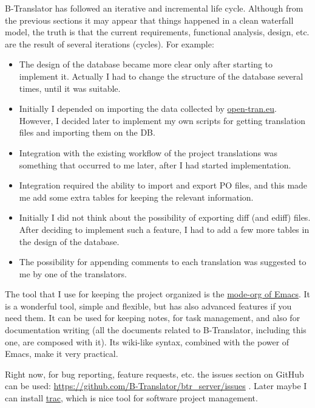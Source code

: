 \documentclass[11pt]{article}
\begin{document}
  B-Translator has followed an iterative and incremental life cycle.
  Although from the previous sections it may appear that things
  happened in a clean waterfall model, the truth is that the current
  requirements, functional analysis, design, etc. are the result of
  several iterations (cycles). For example:
\begin{itemize}
\item The design of the database became more clear only after starting
    to implement it. Actually I had to change the structure of the
    database several times, until it was suitable.
\item Initially I depended on importing the data collected by
    \href{http://open-tran.eu/}{open-tran.eu}. However, I decided later to implement my own scripts
    for getting translation files and importing them on the DB.
\item Integration with the existing workflow of the project translations
    was something that occurred to me later, after I had started
    implementation.
\item Integration required the ability to import and export PO files,
    and this made me add some extra tables for keeping the relevant
    information.
\item Initially I did not think about the possibility of exporting diff
    (and ediff) files.  After deciding to implement such a feature, I
    had to add a few more tables in the design of the database.
\item The possibility for appending comments to each translation was
    suggested to me by one of the translators.
\end{itemize}
  The tool that I use for keeping the project organized is the
  \href{http://orgmode.org/}{mode-org of Emacs}. It is a wonderful tool, simple and flexible, but
  has also advanced features if you need them. It can be used for
  keeping notes, for task management, and also for documentation
  writing (all the documents related to B-Translator, including this
  one, are composed with it). Its wiki-like syntax, combined with the
  power of Emacs, make it very practical.

  Right now, for bug reporting, feature requests, etc. the issues
  section on GitHub can be used:
  \href{https://github.com/B-Translator/btr_server/issues}{https://github.com/B-Translator/btr_server/issues} . Later maybe I
  can install \href{http://trac.edgewall.org/}{trac}, which is nice tool for software project
  management.
\end{document}
